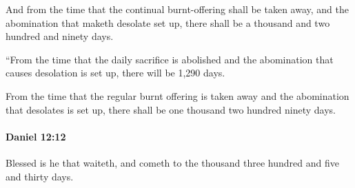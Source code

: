 			\begin{versebox}
					\item[BHS] 
					\item[LXX] 
					\item[ASV] And from the time that the continual burnt-offering shall be taken away, and the abomination that maketh desolate set up, there shall be a thousand and two hundred and ninety days.
					\item[NIV] “From the time that the daily sacrifice is abolished and the abomination that causes desolation is set up, there will be 1,290 days.
					\item[NRSV] From the time that the regular burnt offering is taken away and the abomination that desolates is set up, there shall be one thousand two hundred ninety days.
			\end{versebox}

		\paragraph{Daniel 12:12} %
			\label{DANIEL-12-12}

			Blessed is he that waiteth, and cometh to the thousand three hundred and five and thirty days.

